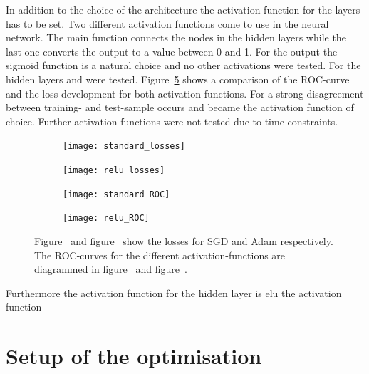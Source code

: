 
In addition to the choice of the architecture the activation function for the layers has to be set.
Two different activation functions come to use in the neural network. The main function connects the nodes in the hidden layers while the last one converts the output to a value between \num{0} and \num{1}. For the output the sigmoid function is a natural choice and no other activations were tested.
For the hidden layers \ELU and \RELU were tested. Figure~\ref{fig:activ} shows a comparison of the ROC-curve and the loss development for both activation-functions. For \RELU a strong disagreement between training- and test-sample occurs and \ELU became the activation function of choice. Further activation-functions were not tested due to time constraints.

\begin{figure}[htbp]
    \centering
    \begin{subfigure}[b]{0.48\textwidth}
        \texttt{[image: standard\_losses]}
        \caption{}
        \label{fig:activ:standard:loss}
    \end{subfigure}
\quad
    \begin{subfigure}[b]{0.48\textwidth}
        \texttt{[image: relu\_losses]}
        \caption{}
        \label{fig:activ:relu:loss}
    \end{subfigure}

    \begin{subfigure}[b]{0.48\textwidth}
		\texttt{[image: standard\_ROC]}
		\caption{}
		\label{fig:activ:standard:roc}
	\end{subfigure}
\quad
	\begin{subfigure}[b]{0.48\textwidth}
		\texttt{[image: relu\_ROC]}
		\caption{}
		\label{fig:activ:relu:roc}
	\end{subfigure}
    \caption{Figure~ and figure~ show the losses for SGD and Adam respectively. The ROC-curves for the different activation-functions are diagrammed in figure~ and figure~.}
	\label{fig:activ}
\end{figure}

Furthermore the activation function for the hidden layer is elu
the activation function 

\section{Setup of the optimisation}

